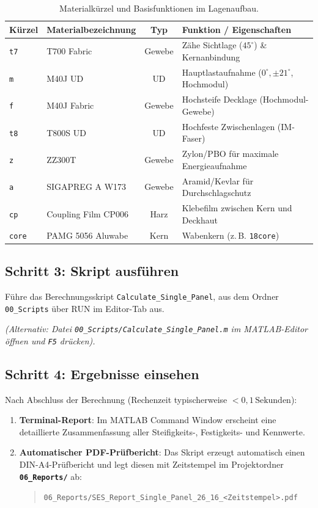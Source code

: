 \begin{table}[htbp]
\centering
\small
\begin{tabular}{llcp{7.5cm}}
\toprule
\textbf{Kürzel} & \textbf{Materialbezeichnung} & \textbf{Typ} & \textbf{Funktion / Eigenschaften} \\
\midrule
\texttt{t7}   & T700 Fabric         & Gewebe & Zähe Sichtlage ($45^\circ$) \& Kernanbindung \\
\texttt{m}    & M40J UD             & UD     & Hauptlastaufnahme ($0^\circ, \pm 21^\circ$, Hochmodul) \\
\texttt{f}    & M40J Fabric         & Gewebe & Hochsteife Decklage (Hochmodul-Gewebe) \\
\texttt{t8}   & T800S UD            & UD     & Hochfeste Zwischenlagen (IM-Faser) \\
\texttt{z}    & ZZ300T              & Gewebe & Zylon/PBO für maximale Energieaufnahme \\
\texttt{a}    & SIGAPREG A W173     & Gewebe & Aramid/Kevlar für Durchschlagschutz \\
\texttt{cp}   & Coupling Film CP006 & Harz   & Klebefilm zwischen Kern und Deckhaut \\
\texttt{core} & PAMG 5056 Aluwabe   & Kern   & Wabenkern (z.\,B. \texttt{18core}) \\
\bottomrule
\end{tabular}
\caption{Materialkürzel und Basisfunktionen im Lagenaufbau.}
\label{tab:quickstart_materials}
\end{table}


\subsection*{Schritt 3: Skript ausführen}

Führe das Berechnungsskript \texttt{Calculate\_Single\_Panel}, 
aus dem Ordner \texttt{00\_Scripts} über RUN im Editor-Tab aus. 

\textit{(Alternativ: Datei \texttt{00\_Scripts/Calculate\_Single\_Panel.m} im MATLAB-Editor öffnen und \texttt{F5} drücken).}





\subsection*{Schritt 4: Ergebnisse einsehen}
Nach Abschluss der Berechnung (Rechenzeit typischerweise $< 0{,}1\,\text{Sekunden}$):
\begin{enumerate}
    \item \textbf{Terminal-Report}: Im MATLAB Command Window erscheint eine detaillierte Zusammenfassung aller Steifigkeits-, Festigkeits- und Kennwerte.
    \item \textbf{Automatischer PDF-Prüfbericht}: Das Skript erzeugt automatisch einen DIN-A4-Prüfbericht und legt diesen mit Zeitstempel im Projektordner \textbf{\texttt{06\_Reports/}} ab:
    \begin{quote}
        \texttt{06\_Reports/SES\_Report\_Single\_Panel\_26\_16\_<Zeitstempel>.pdf}
    \end{quote}
\end{enumerate}
